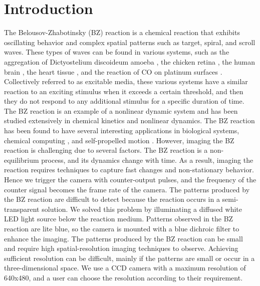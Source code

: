 \documentclass[journal=jacsat,manuscript=article]{achemso}
\begin{document}
\section{Introduction}
The Belousov-Zhabotinsky (BZ) reaction is a chemical reaction that exhibits oscillating behavior and complex spatial patterns such as target, spiral, and scroll waves. These types of waves can be found in various systems, such as the aggregation of Dictyostelium discoideum amoeba \cite{tan2020topological}, the chicken retina \cite{yu2012reentrant}, the human brain \cite{rostami2018defects}, the heart tissue \cite{lebert2023reconstruction}, and the reaction of CO on platinum surfaces \cite{bhattacharya2019controlling}.  Collectively referred to as excitable media, these various systems have a similar reaction to an exciting stimulus when it exceeds a certain threshold, and then they do not respond to any additional stimulus for a specific duration of time. The BZ reaction is an example of a nonlinear dynamic system and has been studied extensively in chemical kinetics and nonlinear dynamics. The BZ reaction has been found to have several interesting applications in biological systems, chemical computing \cite{steinbock1996chemical}\cite{gruenert2013multi}, and self-propelled motion \cite{kumar2021fast}\cite{suematsu2018evolution}. 
However, imaging the BZ reaction is challenging due to several factors. The BZ reaction is a non-equilibrium process, and its dynamics change with time. As a result, imaging the reaction requires techniques to capture fast changes and non-stationary behavior. Hence we trigger the camera with counter-output pulses, and the frequency of the counter signal becomes the frame rate of the camera. The patterns produced by the BZ reaction are difficult to detect because the reaction occurs in a semi-transparent solution. We solved this problem by illuminating a diffused white LED light source below the reaction medium. Patterns observed in the BZ reaction are lite blue, so the camera is mounted with a blue dichroic filter to enhance the imaging. The patterns produced by the BZ reaction can be small and require high spatial-resolution imaging techniques to observe. Achieving sufficient resolution can be difficult, mainly if the patterns are small or occur in a three-dimensional space. We use a CCD camera with a maximum resolution of 640x480, and a user can choose the resolution according to their requirement.
\end{document}
